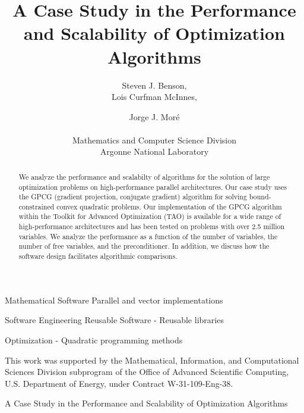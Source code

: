 \documentclass{esub2acm}
\begin{document}
\title{A Case Study in the Performance and Scalability of
Optimization Algorithms\footnotemark}

\author{Steven J. Benson, \\
Lois Curfman McInnes,
\and
Jorge J. Mor\'e \\
\\
Mathematics and Computer Science Division \\
Argonne National Laboratory
}

\begin{abstract}
We analyze the performance and scalabilty of algorithms for the
solution of large optimization problems on 
high-performance parallel architectures.
Our case study uses the GPCG (gradient projection, conjugate gradient) algorithm
for solving bound-constrained convex quadratic problems.
Our implementation of the GPCG algorithm within the Toolkit for 
Advanced Optimization (TAO) is available
for a wide range of high-performance architectures
and has been tested on problems with over 2.5 million variables.
We analyze the performance as a function of the number of variables, 
the number of
free variables, and the preconditioner.
In addition, we discuss how the software
design facilitates algorithmic comparisons.
\end{abstract}


 {Mathematical Software} {Parallel and vector implementations}

 {Software Engineering} {Reusable Software - Reusable libraries}

 {Optimization - Quadratic programming methods}



\begin{bottomstuff}
This work was supported by the Mathematical, Information, and
Computational Sciences Division subprogram of the Office of Advanced
Scientific Computing, U.S. Department of Energy, under Contract
W-31-109-Eng-38.
\begin{authinfo}
\end{authinfo}
\permission
\end{bottomstuff}
     {A Case Study in the Performance and Scalability of
Optimization Algorithms}
\maketitle
\end{document}
